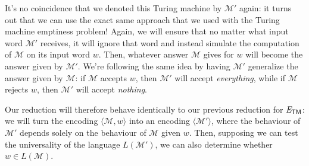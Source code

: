It's no coincidence that we denoted this Turing machine by $\mathcal{M}'$ again: it turns out that we can use the exact same approach that we used with the Turing machine emptiness problem! Again, we will ensure that no matter what input word $\mathcal{M}'$ receives, it will ignore that word and instead simulate the computation of $\mathcal{M}$ on its input word $w$. Then, whatever answer $\mathcal{M}$ gives for $w$ will become the answer given by $\mathcal{M}'$. We're following the same idea by having $\mathcal{M}'$ generalize the answer given by $\mathcal{M}$: if $\mathcal{M}$ accepts $w$, then $\mathcal{M}'$ will accept \emph{everything}, while if $\mathcal{M}$ rejects $w$, then $\mathcal{M}'$ will accept \emph{nothing}.

Our reduction will therefore behave identically to our previous reduction for $\mathit{E}_{\textsf{TM}}$: we will turn the encoding $\langle \mathcal{M}, w \rangle$ into an encoding $\langle \mathcal{M}' \rangle$, where the behaviour of $\mathcal{M}'$ depends solely on the behaviour of $\mathcal{M}$ given $w$. Then, supposing we can test the universality of the language $L(\mathcal{M}')$, we can also determine whether $w \in L(\mathcal{M})$.

